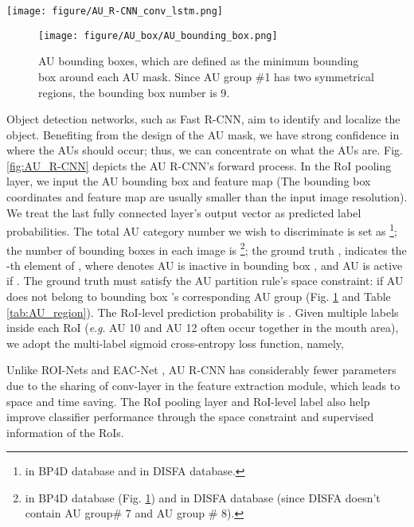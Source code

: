 \documentclass[5p,twocolumn]{elsarticle}
\newcommand{\eg}{\textit{e}.\textit{g}. }
\begin{document}
\begin{figure*}[t]
	\centering
	\texttt{[image: figure/AU\_R-CNN\_conv\_lstm.png]}
	\caption{AU R-CNN integrated with ConvLSTM architecture, where  denotes mini-batch size;  denotes the frames to process in each iteration;  denotes AU bounding box number; , , and  denotes the ConvLSTM's output channel number, height and width respectively. \#class denotes the AU category number we wish to discriminate. }
	\label{fig:AR_conv_lstm}
\end{figure*}
\begin{figure}[h]
	\setlength{\abovecaptionskip}{0pt}
	\setlength{\abovecaptionskip}{0pt}
	
	\texttt{[image: figure/AU\_box/AU\_bounding\_box.png]}
	
	\caption{AU bounding boxes, which are defined as the minimum bounding box around each AU mask. Since AU group \#1 has two symmetrical regions, the bounding box number is 9.}
	\label{fig:AU_bounding_box}
\end{figure}
Object detection networks, such as Fast R-CNN, aim to identify and localize the object. Benefiting from the design of the AU mask, we have strong confidence in where the AUs should occur; thus, we can concentrate on what the AUs are. Fig. \ref{fig:AU_R-CNN} depicts the AU R-CNN's forward process. In the RoI pooling layer, we input the AU bounding box and feature map (The bounding box coordinates and feature map are usually  smaller than the input image resolution). We treat the last fully connected layer's output vector as predicted label probabilities. The total AU category number we wish to discriminate is set as \footnote{ in BP4D database and  in DISFA database.}; the number of bounding boxes in each image is  \footnote{ in BP4D database (Fig. \ref{fig:AU_bounding_box}) and  in DISFA database (since DISFA doesn't contain AU group\# 7 and AU group \# 8).}; the ground truth  ,  indicates the -th element of , where  denotes AU  is inactive in bounding box , and AU  is active if . The ground truth  must satisfy the AU partition rule's space constraint:  if AU  does not belong to bounding box 's corresponding AU group (Fig. \ref{fig:AU_bounding_box} and Table \ref{tab:AU_region}). The RoI-level prediction probability is . Given multiple labels inside each RoI (\eg AU 10 and AU 12 often occur together in the mouth area), we adopt the multi-label sigmoid cross-entropy loss function, namely,


Unlike ROI-Nets \cite{li2017action} and EAC-Net \cite{li2017eac}, AU R-CNN has considerably fewer parameters due to the sharing of conv-layer in the feature extraction module, which leads to space and time saving. The RoI pooling layer and RoI-level label also help improve classifier performance through the space constraint and supervised information of the RoIs.
 
\end{document}
